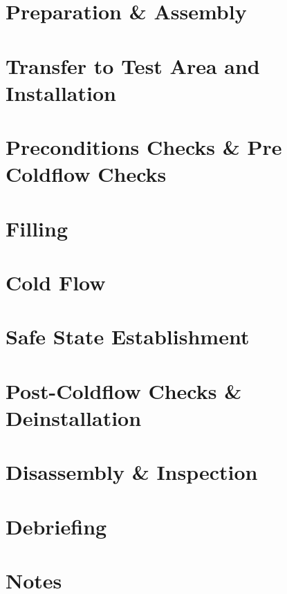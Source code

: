 \documentclass{article}
\begin{document}
\section{Preparation \& Assembly}


\section{Transfer to Test Area and Installation}


\section{Preconditions Checks \& Pre Coldflow Checks}


\section{Filling}


\section{Cold Flow}


\section{Safe State Establishment}


\section{Post-Coldflow Checks \& Deinstallation}


\section{Disassembly \& Inspection}


\section{Debriefing}

\newpage

\setcounter{section}{0}
\section*{Notes}

\end{document}
